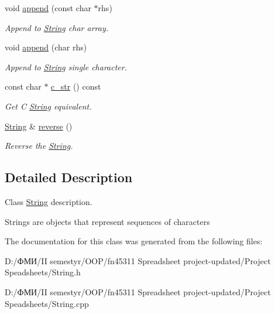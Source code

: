 \begin{DoxyCompactItemize}
\mbox{\label{class_string_a6c449d5487bb1c221a5ca1bc8a059e3e}} 
void \hyperlink{class_string_a6c449d5487bb1c221a5ca1bc8a059e3e}{append} (const char $\ast$rhs)
\begin{DoxyCompactList}\small\item\em Append to \hyperlink{class_string}{String} char array. \end{DoxyCompactList}\item 
\mbox{\label{class_string_a06cfb5d1197818e5e74917cd5a38bf40}} 
void \hyperlink{class_string_a06cfb5d1197818e5e74917cd5a38bf40}{append} (char rhs)
\begin{DoxyCompactList}\small\item\em Append to \hyperlink{class_string}{String} single character. \end{DoxyCompactList}\item 
\mbox{\label{class_string_a8d485340c77fd86c2bd8f1ad2b121100}} 
const char $\ast$ \hyperlink{class_string_a8d485340c77fd86c2bd8f1ad2b121100}{c\+\_\+str} () const
\begin{DoxyCompactList}\small\item\em Get C \hyperlink{class_string}{String} equivalent. \end{DoxyCompactList}\item 
\mbox{\label{class_string_a597b55398b59678ee02a42b490b8c2fe}} 
\hyperlink{class_string}{String} \& \hyperlink{class_string_a597b55398b59678ee02a42b490b8c2fe}{reverse} ()
\begin{DoxyCompactList}\small\item\em Reverse the \hyperlink{class_string}{String}. \end{DoxyCompactList}\end{DoxyCompactItemize}


\subsection{Detailed Description}
Class \hyperlink{class_string}{String} description. 

Strings are objects that represent sequences of characters 

The documentation for this class was generated from the following files\+:\begin{DoxyCompactItemize}
\item 
D\+:/ФМИ/\+I\+I semestyr/\+O\+O\+P/fn45311 Spreadsheet project-\/updated/\+Project Speadsheets/String.\+h\item 
D\+:/ФМИ/\+I\+I semestyr/\+O\+O\+P/fn45311 Spreadsheet project-\/updated/\+Project Speadsheets/String.\+cpp\end{DoxyCompactItemize}
